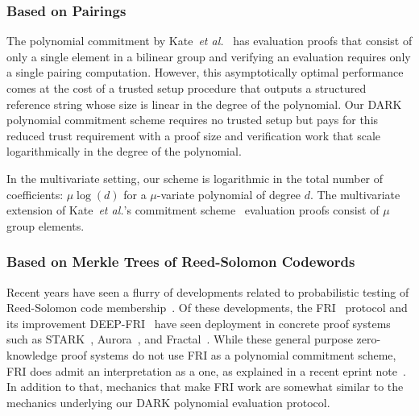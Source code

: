 \subsubsection{Based on Pairings}

The polynomial commitment by Kate~\emph{et al.}~\cite{AC:KatZavGol10} has evaluation proofs that consist of only a single element in a bilinear group and verifying an evaluation requires only a single pairing computation. However, this asymptotically optimal performance comes at the cost of a trusted setup procedure that outputs a structured reference string whose size is linear in the degree of the polynomial. Our DARK polynomial commitment scheme requires no trusted setup but pays for this reduced trust requirement with a proof size and verification work that scale logarithmically in the degree of the polynomial.

In the multivariate setting, our scheme is logarithmic in the total number of coefficients: $\mu\log(d)$ for a $\mu$-variate polynomial of degree $d$. The multivariate extension of Kate~\emph{et al.}'s commitment scheme~\cite{SP:ZGKPP17} evaluation proofs consist of $\mu$ group elements.

\subsubsection{Based on Merkle Trees of Reed-Solomon Codewords}

Recent years have seen a flurry of developments related to probabilistic testing of Reed-Solomon code membership~\cite{SIAMCOMP:BS08,STOC:BCGT13,ECCC:BGR16,ICALP:BBHR18,DEEPFRI}. Of these developments, the FRI~\cite{ICALP:BBHR18} protocol and its improvement DEEP-FRI~\cite{DEEPFRI} have seen deployment in concrete proof systems such as \textsf{STARK}~\cite{C:BBHR19}, \textsf{Aurora}~\cite{EC:BCRSVW19}, and \textsf{Fractal}~\cite{Fractal}. While these general purpose zero-knowledge proof systems do not use FRI as a polynomial commitment scheme, FRI does admit an interpretation as a one, as explained in a recent eprint note~\cite{MatterLabs}. In addition to that, mechanics that make FRI work are somewhat similar to the mechanics underlying our DARK polynomial evaluation protocol.


